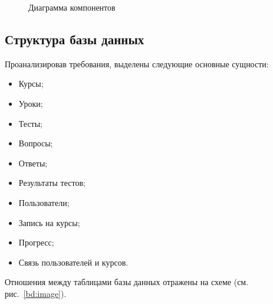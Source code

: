 \begin{figure}[htp!]
	\caption{Диаграмма компонентов}
	\label{diag:image}
\end{figure}

\subsection{Структура базы данных}

Проанализировав требования, выделены следующие основные сущности:
\begin{itemize}
	\item Курсы;
	\item Уроки;
	\item Тесты;
	\item Вопросы;
	\item Ответы;
	\item Результаты тестов;
	\item Пользователи;
	\item Запись на курсы;
	\item Прогресс;
	\item Связь пользователей и курсов.
\end{itemize}

Отношения между таблицами базы данных отражены на схеме (см. рис.~\ref{bd:image}).

